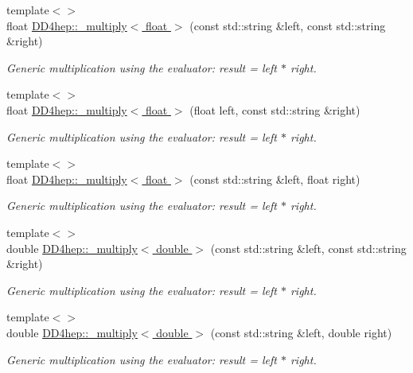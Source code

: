 \begin{DoxyCompactItemize}
{\footnotesize template$<$$>$ }\\float \hyperlink{group___d_d4_h_e_p___g_e_o_m_e_t_r_y_gaac33f3690327f7c9503ddc2d8a075e0f}{DD4hep::\_\-multiply$<$ float $>$} (const std::string \&left, const std::string \&right)
\begin{DoxyCompactList}\small\item\em Generic multiplication using the evaluator: result = left $\ast$ right. \item\end{DoxyCompactList}\item 
{\footnotesize template$<$$>$ }\\float \hyperlink{group___d_d4_h_e_p___g_e_o_m_e_t_r_y_gab91a9667115aab054a1b31f47873fd85}{DD4hep::\_\-multiply$<$ float $>$} (float left, const std::string \&right)
\begin{DoxyCompactList}\small\item\em Generic multiplication using the evaluator: result = left $\ast$ right. \item\end{DoxyCompactList}\item 
{\footnotesize template$<$$>$ }\\float \hyperlink{group___d_d4_h_e_p___g_e_o_m_e_t_r_y_ga3badaa36725100fdd50bb670e3c2502f}{DD4hep::\_\-multiply$<$ float $>$} (const std::string \&left, float right)
\begin{DoxyCompactList}\small\item\em Generic multiplication using the evaluator: result = left $\ast$ right. \item\end{DoxyCompactList}\item 
{\footnotesize template$<$$>$ }\\double \hyperlink{group___d_d4_h_e_p___g_e_o_m_e_t_r_y_ga22e97dd98843857d9b401db28e27aa01}{DD4hep::\_\-multiply$<$ double $>$} (const std::string \&left, const std::string \&right)
\begin{DoxyCompactList}\small\item\em Generic multiplication using the evaluator: result = left $\ast$ right. \item\end{DoxyCompactList}\item 
{\footnotesize template$<$$>$ }\\double \hyperlink{group___d_d4_h_e_p___g_e_o_m_e_t_r_y_ga44578801df360dd011986159650ddb4d}{DD4hep::\_\-multiply$<$ double $>$} (const std::string \&left, double right)
\begin{DoxyCompactList}\small\item\em Generic multiplication using the evaluator: result = left $\ast$ right. \item\end{DoxyCompactList}\item 

\end{DoxyCompactItemize}
